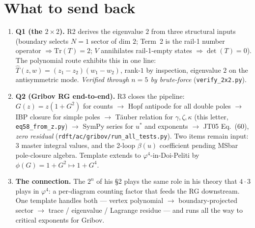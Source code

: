 \documentclass[11pt,a4paper]{article}
\begin{document}
\section*{What to send back}

\begin{enumerate}[leftmargin=2em,itemsep=2pt,topsep=2pt]
  \item \textbf{Q1 (the $2{\times}2$).} R2 derives the eigenvalue $2$ from three structural inputs (boundary selects $N{=}1$ sector of dim $2$; Term~2 is the rail-1 number operator $\Rightarrow \mathrm{Tr}(T)=2$; $V$ annihilates rail-1-empty states $\Rightarrow \det(T)=0$). The polynomial route exhibits this in one line: $\widehat T(z,w) = (z_1-z_2)(w_1-w_2)$, rank-$1$ by inspection, eigenvalue $2$ on the antisymmetric mode. \emph{Verified through $n=5$ by brute-force} (\texttt{verify\_2x2.py}).
  \item \textbf{Q2 (Gribov RG end-to-end).} R3 closes the pipeline: $G(z) = z(1+G^2)$ for counts $\to$ Hopf antipode for all double poles $\to$ IBP closure for simple poles $\to$ T\"auber relation for $\gamma, \zeta, \kappa$ (this letter, \texttt{eq58\_from\_z.py}) $\to$ SymPy series for $u^*$ and exponents $\to$ JT05 Eq.~(60), \emph{zero residual} (\texttt{rdft/ac/gribov/run\_all\_tests.py}). Two items remain input: 3 master integral values, and the 2-loop $\beta(u)$ coefficient pending MSbar pole-closure algebra. Template extends to $\varphi^4$-in-Doi-Peliti by $\phi(G)=1+G^2 \mapsto 1+G^4$.
  \item \textbf{The connection.} The $2^n$ of his §2 plays the same role in his theory that $4\cdot 3$ plays in $\varphi^4$: a per-diagram counting factor that feeds the RG downstream. One template handles both --- vertex polynomial $\to$ boundary-projected sector $\to$ trace / eigenvalue / Lagrange residue --- and runs all the way to critical exponents for Gribov.
\end{enumerate}
\end{document}
